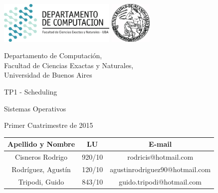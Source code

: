 \documentclass[a4paper,10pt,twoside]{article}
\begin{document}


\thispagestyle{caratula}

\begin{center}

\includegraphics[height=2cm]{DC.png} 
\hfill
\includegraphics[height=2cm]{UBA.jpg} 

\vspace{2cm}

Departamento de Computación,\\
Facultad de Ciencias Exactas y Naturales,\\
Universidad de Buenos Aires

\vspace{4cm}

\begin{Huge}
TP1 - Scheduling
\end{Huge}

\vspace{0.5cm}

\begin{Large}
Sistemas Operativos
\end{Large}

\vspace{1cm}

Primer Cuatrimestre de 2015

\vspace{4cm}

\vspace{0.5cm}

\begin{tabular}{|c|c|c|}
\hline
Apellido y Nombre & LU & E-mail\\
\hline
Cisneros Rodrigo		& 920/10 & rodricis@hotmail.com\\
Rodr\'iguez, Agust\'in	& 120/10 & agustinrodriguez90@hotmail.com\\
Tripodi, Guido			& 843/10 & guido.tripodi@hotmail.com\\
\hline
\end{tabular}

\end{center}
\end{document}
